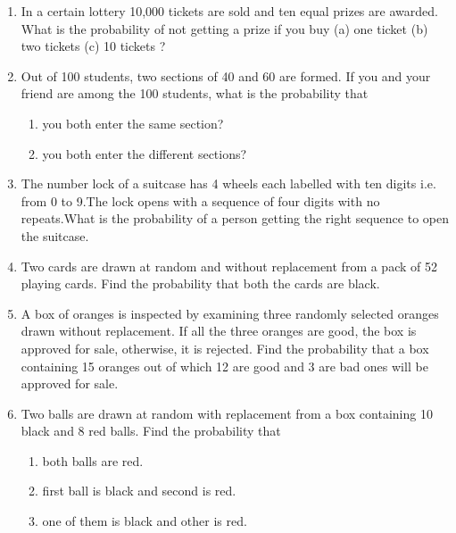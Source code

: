 \begin{enumerate}[label=\thesection.\arabic*,ref=\thesection.\theenumi]
\\
\solution
\item In a certain lottery 10,000 tickets are sold and ten equal prizes are awarded. What is the probability of not getting a prize if you buy (a) one ticket (b) two tickets (c) 10 tickets ?	
\\
\solution
\item 
Out of 100 students, two sections of 40 and 60 are formed. If you and your friend are among the 100 students, what is the probability that
\begin{enumerate}
\item you both enter the same section?
\item you both enter the different sections?
\end{enumerate}
\solution
	\item 
The number lock of a suitcase has 4 wheels each labelled with ten digits i.e. from 0 to 9.The lock opens with a sequence of four digits with no repeats.What is the probability of a person getting the right sequence to open the suitcase.
\\
\solution
\item 
Two cards are drawn at random and without replacement from a pack of 52 playing cards. Find the probability that both the cards are black.
\\
\solution
		\item A box of oranges is inspected by examining three randomly selected oranges drawn without replacement. If all the three oranges are good, the box is approved for sale, otherwise, it is rejected. Find the probability that a box containing 15 oranges out of which 12 are good and 3 are bad ones will be approved for sale.
		\label{ncert/12/13/2/3/defs.tex}
		\item Two balls are drawn at random with replacement from a box containing 10 black and 8 red balls. Find the probability that
		\label{ncert/12/13/2/12}
\begin{enumerate}
\item both balls are red.
\item first ball is black and second is red.
\item one of them is black and other is red.
\end{enumerate}


\end{enumerate}
